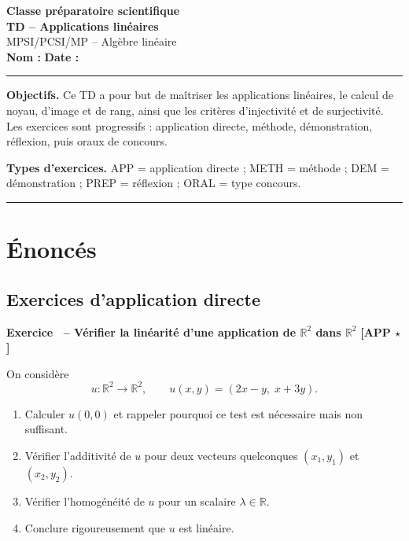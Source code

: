 \documentclass[11pt,a4paper]{article}
\newcounter{exo}
\newcommand{\exo}[3]{
    \refstepcounter{exo}
    \vspace{0.45cm}
    \noindent
    \colorbox{grisclair}{
    \parbox{0.965\linewidth}{
    \textbf{\textcolor{bleuprepa}{Exercice \theexo\ -- #1}}
    \hfill
    \textbf{[#2 \; #3]}
    }}
    \vspace{0.15cm}
}
\newcommand{\R}{\mathbb{R}}
\begin{document}
\begin{center}
    {\Large \textbf{Classe préparatoire scientifique}}\\[0.2cm]
    {\Huge \textbf{\textcolor{bleuprepa}{TD -- Applications linéaires}}}\\[0.2cm]
    {\Large MPSI/PCSI/MP -- Algèbre linéaire}\\[0.25cm]
    \textbf{Nom :} \underline{\hspace{5cm}}
    \hfill
    \textbf{Date :} \underline{\hspace{3cm}}
\end{center}

\vspace{0.35cm}
\hrule
\vspace{0.25cm}

\noindent\textbf{Objectifs.}
Ce TD a pour but de maîtriser les applications linéaires, le calcul de noyau, d'image et de rang, ainsi que les critères d'injectivité et de surjectivité. Les exercices sont progressifs : application directe, méthode, démonstration, réflexion, puis oraux de concours.

\vspace{0.2cm}
\noindent\textbf{Types d'exercices.}
APP = application directe ; METH = méthode ; DEM = démonstration ; PREP = réflexion ; ORAL = type concours.

\vspace{0.25cm}
\hrule

\tableofcontents
\newpage

\section{Énoncés}

\subsection{Exercices d'application directe}

\exo{Vérifier la linéarité d'une application de $\R^2$ dans $\R^2$}{APP}{$\star$}
On considère
\[
u:\R^2\to\R^2,\qquad u(x,y)=(2x-y,\;x+3y).
\]
\begin{enumerate}
    \item Calculer $u(0,0)$ et rappeler pourquoi ce test est nécessaire mais non suffisant.
    \item Vérifier l'additivité de $u$ pour deux vecteurs quelconques $(x_1,y_1)$ et $(x_2,y_2)$.
    \item Vérifier l'homogénéité de $u$ pour un scalaire $\lambda\in\R$.
    \item Conclure rigoureusement que $u$ est linéaire.
\end{enumerate}
\end{document}
